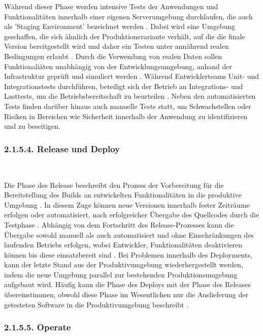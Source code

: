Während dieser Phase werden intensive Tests der Anwendungen und Funktionalitäten innerhalb einer eigenen Serverumgebung durchlaufen, die auch als 'Staging Environment' bezeichnet werden \cite[S. 16]{verona_practical_2016}. Dabei wird eine Umgebung geschaffen, die sich ähnlich der Produktionsvariante verhält, auf die die finale Version bereitgestellt wird und daher ein Testen unter annährend realen Bedingungen erlaubt \cite[S. 5.2/5.6]{bass_devops_2015}. Durch die Verwendung von realen Daten sollen Funktionaliäten unabhängig von der Entwicklungsumgebung, anhand der Infrastruktur geprüft und simuliert werden \cite[S. 16]{verona_practical_2016}. Während Entwicklerteams Unit- und Integrationstests durchführen, beteiligt sich der Betrieb an Integrations- und Lasttests, um die Betriebsbereitschaft zu beurteilen \cite[S. 127]{sturm_devops_2017}. Neben den automatisierten Tests finden darüber hinaus auch manuelle Tests statt, um Schwachstellen oder Risiken in Bereichen wie Sicherheit innerhalb der Anwendung zu identifizieren und zu beseitigen.

\subsubsection{2.1.5.4. Release und Deploy} $~$

Die Phase des Release beschreibt den Prozess der Vorbereitung für die Bereitstellung des Builds an entwickelten Funktionalitäten in die produktive Umgebung \cite[S. 20]{halstenberg_devops_2020}. In diesem Zuge können neue Versionen innerhalb fester Zeiträume erfolgen oder automatisiert, nach erfolgreicher Übergabe des Quellcodes durch die Testphase \cite{thedev_eight_2019}. Abhängig von dem Fortschritt des Release-Prozesses kann die Übergabe sowohl manuell als auch automatisiert und ohne Einschränkungen des laufenden Betriebs erfolgen, wobei Entwickler, Funktionalitäten deaktivieren können bis diese einsatzbereit sind \cite{thedev_eight_2019}. Bei Problemen innerhalb des Deployments, kann der letzte Stand aus der Produktivumgebung wiederhergestellt werden, indem die neue Umgebung parallel zur bestehenden Produktionsumgebung aufgebaut wird. Häufig kann die Phase des Deploys mit der Phase des Releases übereinstimmen, obwohl diese Phase im Wesentlichen nur die Auslieferung der getesteten Software in die Produktivumgebung beschreibt \cite[S. 20]{halstenberg_devops_2020}.

\subsubsection{2.1.5.5. Operate} $~$

